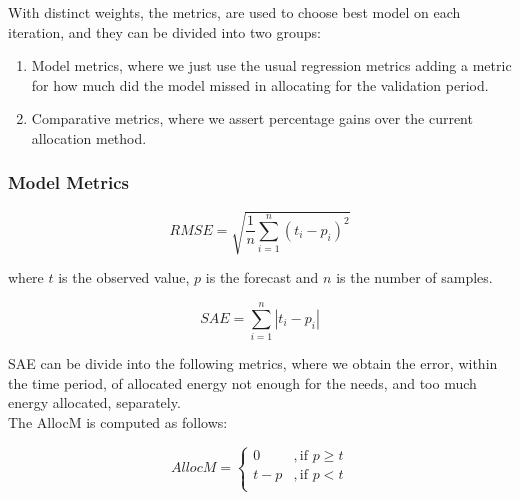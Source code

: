 
With distinct weights, the metrics, are used to choose best model on each iteration, and they can be divided into two groups:

\begin{enumerate}
\item Model metrics, where we just use the usual regression metrics adding a metric for how much did the model missed in allocating for the validation period.
\item Comparative metrics, where we assert percentage gains over the current allocation method. 
\end{enumerate} 

\subsubsection{Model Metrics}
\begin{linenomath}
    \begin{equation}\label{eq:rmse}
        RMSE = \sqrt{\frac{1}{n} \sum_{i=1}^{n}(t_i - p_i)^2}
    \end{equation}
    \end{linenomath}
		
		where $t$ is the observed value, $p$ is the forecast and $n$ is the number of samples.

\begin{linenomath}
    \begin{equation}\label{eq:SAE}
        SAE = \sum_{i=1}^{n}\left|t_i - p_i \right|
    \end{equation}
    \end{linenomath}

SAE can be divide into the following metrics, where we obtain the error, within the time period, of allocated energy not enough for the needs, and too much energy allocated, separately.\\

The \gls{AllocM} is computed as follows:
\begin{linenomath}
    \begin{equation}\label{eq:AllocM}
        AllocM = 
        \begin{cases} 
            0 & , \text{if } p \geq t \\
            t - p  & , \text{if } p < t \\
        \end{cases} 
        \end{equation}
    \end{linenomath}
		
